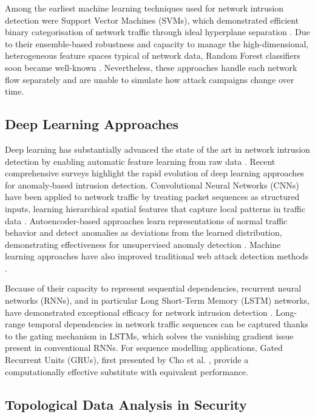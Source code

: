 \documentclass[conference]{IEEEtran}
\begin{document}
Among the earliest machine learning techniques used for network intrusion detection were Support Vector Machines (SVMs), which demonstrated efficient binary categorisation of network traffic through ideal hyperplane separation \cite{ref2, ref18}. Due to their ensemble-based robustness and capacity to manage the high-dimensional, heterogeneous feature spaces typical of network data, Random Forest classifiers soon became well-known \cite{ref3, ref17}. Nevertheless, these approaches handle each network flow separately and are unable to simulate how attack campaigns change over time.

\subsection{Deep Learning Approaches}

Deep learning has substantially advanced the state of the art in network intrusion detection by enabling automatic feature learning from raw data \cite{ref14, ref26}. Recent comprehensive surveys \cite{ref28, ref31} highlight the rapid evolution of deep learning approaches for anomaly-based intrusion detection. Convolutional Neural Networks (CNNs) have been applied to network traffic by treating packet sequences as structured inputs, learning hierarchical spatial features that capture local patterns in traffic data \cite{ref4}. Autoencoder-based approaches learn representations of normal traffic behavior and detect anomalies as deviations from the learned distribution, demonstrating effectiveness for unsupervised anomaly detection \cite{ref5}. Machine learning approaches have also improved traditional web attack detection methods \cite{ref32}.

Because of their capacity to represent sequential dependencies, recurrent neural networks (RNNs), and in particular Long Short-Term Memory (LSTM) networks, have demonstrated exceptional efficacy for network intrusion detection \cite{ref6, ref15}. Long-range temporal dependencies in network traffic sequences can be captured thanks to the gating mechanism in LSTMs, which solves the vanishing gradient issue present in conventional RNNs. For sequence modelling applications, Gated Recurrent Units (GRUs), first presented by Cho et al. \cite{ref27}, provide a computationally effective substitute with equivalent performance.

\subsection{Topological Data Analysis in Security}
\end{document}
